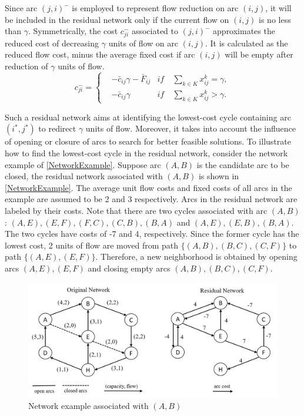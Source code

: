 \documentclass[11pt,nonblindrev,fleqn]{article}
\begin{document}
Since arc $(j,i)^-$ is employed to represent flow reduction on arc $(i,j)$, it will be included in the residual network only if the current flow on $(i,j)$ is no less than $\gamma$. Symmetrically, the cost $c_{ji}^-$ associated to $(j,i)^-$ approximates the reduced cost of decreasing $\gamma$ units of flow on arc $(i,j)$. It is calculated as the reduced flow cost, minus the average fixed cost if arc $(i,j)$ will be empty after reduction of $\gamma$ units of flow.
\begin{equation*}
c_{ji}^- = \left\{
\begin{aligned}
&-\bar{c}_{ij} \gamma - \bar{F}_{ij}  &if \ & \sum_{k\in K} x_{ij}^k = \gamma, \\
&-\bar{c}_{ij} \gamma                  &if \ &\sum_{k\in K} x_{ij}^k > \gamma.
\end{aligned}
\right.
\end{equation*}

Such a residual network aims at identifying the lowest-cost cycle containing arc $(i^*,j^*)$ to redirect $\gamma$ units of flow. Moreover, it takes into account the influence of opening or closure of arcs to search for better feasible solutions. To illustrate how to find the lowest-cost cycle in the residual network, consider the network example of \autoref{NetworkExample}. Suppose arc $(A,B)$ is the candidate arc to be closed, the residual network associated with $(A,B)$ is shown in \autoref{NetworkExample}. The average unit flow costs and fixed costs of all arcs in the example are assumed to be 2 and 3 respectively. Arcs in the residual network are labeled by their costs. Note that there are two cycles associated with arc $(A,B)$: $(A,E),(E,F),(F,C),(C,B),(B,A)$ and $(A,E),(E,B),(B,A)$. The two cycles have costs of -7 and 4, respectively. Since the former cycle has the lowest cost, 2 units of flow are moved from path $\{(A,B),(B,C),(C,F)\}$ to path $\{(A,E),(E,F)\}$. Therefore, a new neighborhood is obtained by opening arcs $(A,E),(E,F)$ and closing empty arcs $(A,B),(B,C),(C,F)$.
\begin{figure}[H]
\setlength{\abovecaptionskip}{-5pt}
\setlength{\belowcaptionskip}{-5pt}
\centering
\includegraphics[width=0.9\linewidth]{F3.png}
\caption{Network example associated with $(A,B)$}
\label{NetworkExample}
\end{figure}
\end{document}
